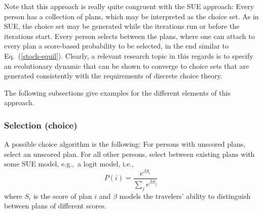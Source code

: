 Note that this approach is really quite congruent with the SUE
approach: Every person has a collection of plans, which may be
interpreted as the choice set.  As in SUE, the choice set may be
generated while the iterations run or before the iterations start.
Every person selects between the plans, where one can attach to
every plan a score-based probability to be selected, 
in the end similar to Eq.~(\ref{stoch-equil}).
Clearly, a relevant research topic in this regards is to specify 
an evolutionary dynamic that can be shown to converge to choice sets
that are generated consistently with the requirements of discrete
choice theory.



The following subsections give examples for the different elements of
this approach.

\subsubsection{Selection (choice)}

A possible choice algorithm is the following: For persons with
unscored plans, select an unscored plan.  For all other persons,
select between existing plans with some SUE model, e.g.,\ a logit
model, i.e.,
\begin{equation}
P(i) = \frac{e^{\beta S_i}}{\sum_j e^{\beta S_j}} \
\label{eq:2}
\end{equation}
where $S_i$ is the score of plan $i$ and $\beta$ models the
travelers' ability to distinguish between plans of different
scores.


